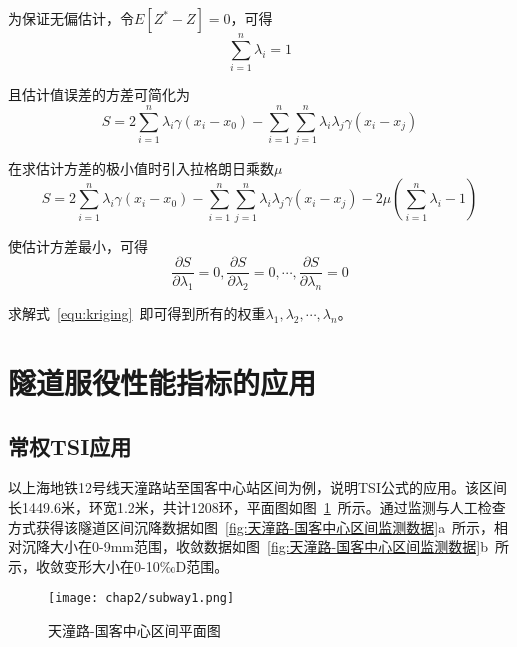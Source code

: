 为保证无偏估计，令$E\left[ {{Z}^{*}}-Z \right]=0$，可得
\begin{equation}
    \sum\limits_{i=1}^{n}{{{\lambda }_{i}}=1}
\end{equation}

且估计值误差的方差可简化为
\begin{equation}
    S=2\sum\limits_{i=1}^{n}{{{\lambda }_{i}}\gamma ({{x}_{i}}-{{x}_{0}})-\sum\limits_{i=1}^{n}{\sum\limits_{j=1}^{n}{{{\lambda }_{i}}{{\lambda }_{j}}\gamma ({{x}_{i}}-{{x}_{j}})}}}
\end{equation}

在求估计方差的极小值时引入拉格朗日乘数$\mu $
\begin{equation}
    S=2\sum\limits_{i=1}^{n}{{{\lambda }_{i}}\gamma ({{x}_{i}}-{{x}_{0}})-\sum\limits_{i=1}^{n}{\sum\limits_{j=1}^{n}{{{\lambda }_{i}}{{\lambda }_{j}}\gamma ({{x}_{i}}-{{x}_{j}})}}}-2\mu (\sum\limits_{i=1}^{n}{{{\lambda }_{i}}-1})
\end{equation}

使估计方差最小，可得
\begin{equation}
    \label{equ:kriging}
    \frac{\partial S}{\partial {{\lambda }_{1}}}=0,\frac{\partial S}{\partial {{\lambda }_{2}}}=0,\cdots ,\frac{\partial S}{\partial {{\lambda }_{n}}}=0
\end{equation}

求解式~\ref{equ:kriging}~即可得到所有的权重${{\lambda }_{1}},{{\lambda }_{2}},\cdots ,{{\lambda }_{n}}$。

\section{隧道服役性能指标的应用}

\subsection{常权TSI应用}

以上海地铁12号线天潼路站至国客中心站区间为例，说明TSI公式的应用。该区间长1449.6米，环宽1.2米，共计1208环，平面图如图~\ref{fig:天潼路-国客中心区间平面图}~所示。通过监测与人工检查方式获得该隧道区间沉降数据如图~\ref{fig:天潼路-国客中心区间监测数据}a~所示，相对沉降大小在0-9mm范围，收敛数据如图~\ref{fig:天潼路-国客中心区间监测数据}b~所示，收敛变形大小在0-10‰D范围。

\begin{figure}[htb!]
    \centering
    \texttt{[image: chap2/subway1.png]}
    \caption{天潼路-国客中心区间平面图}
    \label{fig:天潼路-国客中心区间平面图}
\end{figure}

